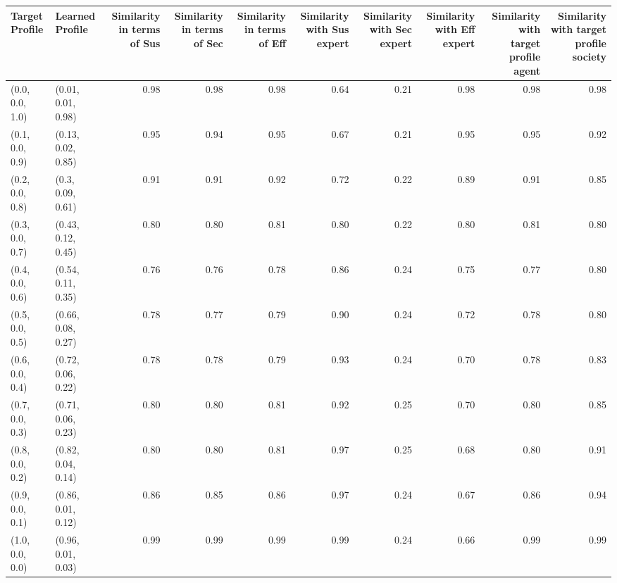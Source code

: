 \begin{tabular}{llrrrrrrrr}
\toprule
Target Profile & Learned Profile & Similarity in terms of Sus & Similarity in terms of Sec & Similarity in terms of Eff & Similarity with Sus expert & Similarity with Sec expert & Similarity with Eff expert & Similarity with target profile agent & Similarity with target profile society \\
\midrule
(0.0, 0.0, 1.0) & (0.01, 0.01, 0.98) & 0.98 & 0.98 & 0.98 & 0.64 & 0.21 & 0.98 & 0.98 & 0.98 \\
(0.1, 0.0, 0.9) & (0.13, 0.02, 0.85) & 0.95 & 0.94 & 0.95 & 0.67 & 0.21 & 0.95 & 0.95 & 0.92 \\
(0.2, 0.0, 0.8) & (0.3, 0.09, 0.61) & 0.91 & 0.91 & 0.92 & 0.72 & 0.22 & 0.89 & 0.91 & 0.85 \\
(0.3, 0.0, 0.7) & (0.43, 0.12, 0.45) & 0.80 & 0.80 & 0.81 & 0.80 & 0.22 & 0.80 & 0.81 & 0.80 \\
(0.4, 0.0, 0.6) & (0.54, 0.11, 0.35) & 0.76 & 0.76 & 0.78 & 0.86 & 0.24 & 0.75 & 0.77 & 0.80 \\
(0.5, 0.0, 0.5) & (0.66, 0.08, 0.27) & 0.78 & 0.77 & 0.79 & 0.90 & 0.24 & 0.72 & 0.78 & 0.80 \\
(0.6, 0.0, 0.4) & (0.72, 0.06, 0.22) & 0.78 & 0.78 & 0.79 & 0.93 & 0.24 & 0.70 & 0.78 & 0.83 \\
(0.7, 0.0, 0.3) & (0.71, 0.06, 0.23) & 0.80 & 0.80 & 0.81 & 0.92 & 0.25 & 0.70 & 0.80 & 0.85 \\
(0.8, 0.0, 0.2) & (0.82, 0.04, 0.14) & 0.80 & 0.80 & 0.81 & 0.97 & 0.25 & 0.68 & 0.80 & 0.91 \\
(0.9, 0.0, 0.1) & (0.86, 0.01, 0.12) & 0.86 & 0.85 & 0.86 & 0.97 & 0.24 & 0.67 & 0.86 & 0.94 \\
(1.0, 0.0, 0.0) & (0.96, 0.01, 0.03) & 0.99 & 0.99 & 0.99 & 0.99 & 0.24 & 0.66 & 0.99 & 0.99 \\
\bottomrule
\end{tabular}

